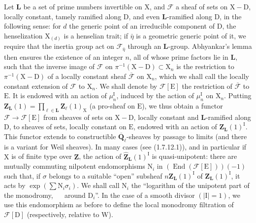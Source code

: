 \documentclass[11pt,leqno]{article}
\newcommand{\Page}[1]{\ifvmode\noindent\else\unskip\ \fi{\footnotesize\textcolor{gray}{[p.\,#1]}}\ \ignorespaces}
\begin{document}
Let \(\mathbf{L}\) be a set of prime numbers invertible on \(\mathrm{X}\), and \(\mathscr{F}\) a sheaf of sets on \(\mathrm{X}-\mathrm{D}\), locally constant, tamely ramified along \(\mathrm{D}\), and even \(\mathbf{L}\)-ramified along \(\mathrm{D}\), in the following sense: for \(d\) the generic point of an irreducible component of \(\mathrm{D}\), the henselization \(\mathrm{X}_{(d)}\) is a henselian trait; if \(\bar{\eta}\) is a geometric generic point of it, we require that the inertia group act on \(\mathscr{F}_{\bar{\eta}}\) through an \(\mathbf{L}\)-group. Abhyankar’s lemma then ensures the existence of an integer \(n\), all of whose prime factors lie in \(\mathbf{L}\), such that the inverse image of \(\mathscr{F}\) on \(\pi^{-1}(\mathrm{X}-\mathrm{D})\subset\mathrm{X}_n\) is the restriction to \(\pi^{-1}(\mathrm{X}-\mathrm{D})\) of a locally constant sheaf \(\overline{\mathscr{F}}\) on \(\mathrm{X}_n\), which we shall call the locally constant extension of \(\mathscr{F}\) to \(\mathrm{X}_n\). We shall denote by \(\mathscr{F}[\mathrm{E}]\) the restriction of \(\overline{\mathscr{F}}\) to \(\mathrm{E}\). It is endowed with an action of \(\mu_n^{\mathrm{I}}\), induced by the action of \(\mu_n^{\mathrm{I}}\) on \(\mathrm{X}_n\). Putting \(\mathbf{Z}_{\mathbf{L}}(1)=\prod\limits_{\ell\in\mathbf{L}}\mathbf{Z}_\ell(1)_{\mathrm{X}}\) (a pro-sheaf on \(\mathrm{E}\)), we thus obtain a functor \(\mathscr{F}\to\mathscr{F}[\mathrm{E}]\) from sheaves of sets on \(\mathrm{X}-\mathrm{D}\), locally constant and \(\mathbf{L}\)-ramified along \(\mathrm{D}\), to sheaves of sets, locally constant on \(\mathrm{E}\), endowed with an action of \(\mathbf{Z}_{\mathbf{L}}(1)^{\mathrm{I}}\).
This functor extends to constructible \(\overline{\mathbf{Q}}_\ell\)-sheaves by passage to limits (and there is a variant for Weil sheaves). In many cases (see (1.7.12.1)), and in particular if \(\mathrm{X}\) is of finite type over \(\mathbf{Z}\), the action of \(\widehat{\mathbf{Z}}_{\mathbf{L}}(1)^{\mathrm{I}}\) is quasi-unipotent: there are mutually commuting nilpotent endomorphisms \(\mathrm{N}_i\) in \((\operatorname{End}(\mathscr{F}[\mathrm{E}]))(-1)\) such that, if \(\sigma\) belongs to a suitable “open” subsheaf \(n\mathbf{Z}_{\mathbf{L}}(1)^{\mathrm{I}}\) of \(\mathbf{Z}_{\mathbf{L}}(1)^{\mathrm{I}}\), it acts by \(\exp(\sum\mathrm{N}_i\sigma_i)\). We shall call \(\mathrm{N}_i\) the “logarithm of the unipotent part of the monodromy,
\Page{173}
around \(\mathrm{D}_i\)”. In the case of a smooth divisor \((|\mathrm{I}|=1)\), we use this endomorphism as before to define the local monodromy filtration of \(\mathscr{F}[\mathrm{D}]\) (respectively, relative to \(\mathrm{W}\)).
\end{document}

